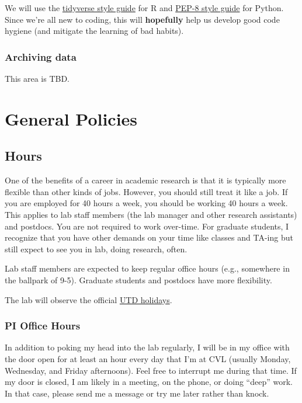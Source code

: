 \documentclass[]{book}
\begin{document}
We will use the \href{https://style.tidyverse.org/}{tidyverse style guide} for R and \href{https://www.python.org/dev/peps/pep-0008/}{PEP-8 style guide} for Python. Since we're all new to coding, this will \textbf{hopefully} help us develop good code hygiene (and mitigate the learning of bad habits).

\hypertarget{archiving-data}{%
\subsection{Archiving data}\label{archiving-data}}

This area is TBD.

\hypertarget{general-policies}{%
\chapter{General Policies}\label{general-policies}}

\hypertarget{hours}{%
\section{Hours}\label{hours}}

One of the benefits of a career in academic research is that it is typically more flexible than other kinds of jobs. However, you should still treat it like a job. If you are employed for 40 hours a week, you should be working 40 hours a week. This applies to lab staff members (the lab manager and other research assistants) and postdocs. You are not required to work over-time. For graduate students, I recognize that you have other demands on your time like classes and TA-ing but still expect to see you in lab, doing research, often.

Lab staff members are expected to keep regular office hours (e.g., somewhere in the ballpark of 9-5). Graduate students and postdocs have more flexibility.

The lab will observe the official \href{https://www.utdallas.edu/hr/news/holidays/}{UTD holidays}.

\hypertarget{pi-office-hours}{%
\subsection{PI Office Hours}\label{pi-office-hours}}

In addition to poking my head into the lab regularly, I will be in my office with the door open for at least an hour every day that I'm at CVL (usually Monday, Wednesday, and Friday afternoons). Feel free to interrupt me during that time. If my door is closed, I am likely in a meeting, on the phone, or doing ``deep'' work. In that case, please send me a message or try me later rather than knock.
\end{document}
